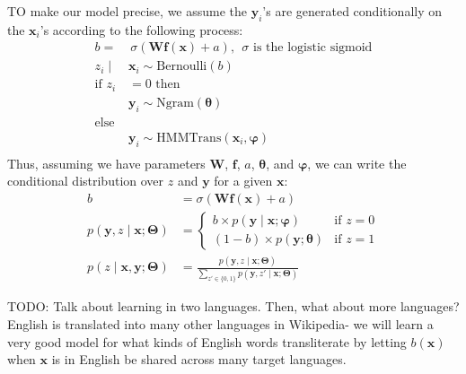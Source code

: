 \documentclass[11pt]{article}
\begin{document}
TO make our model precise, we assume the $\boldsymbol{y}_i$'s are generated conditionally on the $\boldsymbol{x}_i$'s according to the following process:
\begin{align*}
b = &\,\sigma(\mathbf{Wf}(\boldsymbol{x}) + a), \ \ \sigma\textrm{ is the logistic sigmoid} \\
z_i \mid \; &\boldsymbol{x}_i \sim \mathrm{Bernoulli}(b) \\
\textrm{if }z_i&=0\textrm{ then} \\
&\boldsymbol{y}_i \sim \mathrm{Ngram}(\boldsymbol{\theta}) \\
\textrm{else}& \\
&\boldsymbol{y}_i \sim \mathrm{HMMTrans}(\boldsymbol{x}_i,\boldsymbol{\varphi}) \\
\end{align*}
Thus, assuming we have parameters $\mathbf{W}$, $\mathbf{f}$, $a$, $\boldsymbol{\theta}$, and $\boldsymbol{\varphi}$, we can write the conditional distribution over $z$ and $\boldsymbol{y}$ for a given $\boldsymbol{x}$:
\begin{align*}
b &=\sigma(\mathbf{Wf}(\boldsymbol{x}) + a)\\
p(\boldsymbol{y},z \mid \boldsymbol{x}; \boldsymbol{\Theta}) &= \begin{cases} b \times p(\boldsymbol{y} \mid \boldsymbol{x} ; \boldsymbol{\varphi}) & \textrm{if $z=0$}\\
(1-b) \times p(\boldsymbol{y}; \boldsymbol{\theta}) & \textrm{if $z=1$}
\end{cases}\\
p(z \mid \boldsymbol{x},\boldsymbol{y}; \boldsymbol{\Theta}) &= \frac{p(\boldsymbol{y},z \mid \boldsymbol{x}; \boldsymbol{\Theta})}{\sum_{z'\in \{0,1\}}p(\boldsymbol{y},z' \mid \boldsymbol{x}; \boldsymbol{\Theta})}
\end{align*}

TODO: Talk about learning in two languages. Then, what about more languages? English is translated into many other languages in Wikipedia- we will learn a very good model for what kinds of English words transliterate by letting $b(\boldsymbol{x})$ when $\boldsymbol{x}$ is in English be shared across many target languages.



\end{document}
